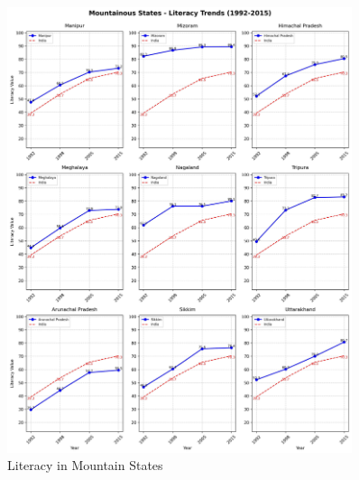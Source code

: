 \begin{figure}[H]
    \centering
    \includegraphics[width=0.9\textwidth]{figures/nfhs/mountainous_states_literacy_subplots.pdf}
    \caption{ Literacy  in Mountain States}
    \label{fig:nfhs_mountain_literacy}
\end{figure}

